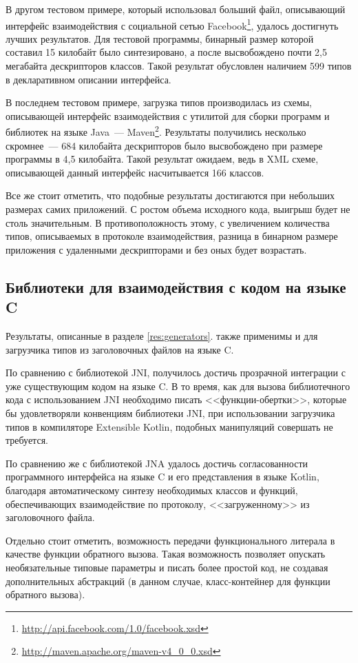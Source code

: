 В другом тестовом примере, который использовал больший файл, описывающий интерфейс взаимодействия с социальной сетью Facebook\footnote{\url{http://api.facebook.com/1.0/facebook.xsd}}, удалось достигнуть лучших результатов.
Для тестовой программы, бинарный размер которой составил 15 килобайт было синтезировано, а после высвобождено почти 2,5 мегабайта дескрипторов классов. Такой результат обусловлен наличием 599 типов в декларативном описании интерфейса.

В последнем тестовом примере, загрузка типов производилась из схемы, описывающей интерфейс взаимодействия с утилитой для сборки программ и библиотек на языке Java~--- Maven\footnote{\url{http://maven.apache.org/maven-v4_0_0.xsd}}.
Результаты получились несколько скромнее~--- 684 килобайта дескрипторов было высвобождено при размере программы в 4,5 килобайта. Такой результат ожидаем, ведь в XML схеме, описывающей данный интерфейс насчитывается 166 классов.

Все же стоит отметить, что подобные результаты достигаются при небольших размерах самих приложений.
С ростом объема исходного кода, выигрыш будет не столь значительным. В противоположность этому, с увеличением количества типов, описываемых в протоколе взаимодействия, разница в бинарном размере приложения с удаленными дескрипторами и без оных будет возрастать.

\subsection{Библиотеки для взаимодействия с кодом на языке C}
Результаты, описанные в разделе \ref{res:generators}. также применимы и для загрузчика типов из заголовочных файлов на языке C.

По сравнению с библиотекой JNI, получилось достичь прозрачной интеграции с уже существующим кодом на языке C.
В то время, как для вызова библиотечного кода с использованием JNI необходимо писать <<функции-обертки>>, которые бы удовлетворяли конвенциям библиотеки JNI, при использовании загрузчика типов в компиляторе Extensible Kotlin, подобных манипуляций совершать не требуется.

По сравнению же с библиотекой JNA удалось достичь согласованности программного интерфейса на языке C и его представления в языке Kotlin,
благодаря автоматическому синтезу необходимых классов и функций, обеспечивающих взаимодействие по протоколу, <<загруженному>> из заголовочного файла.

Отдельно стоит отметить, возможность передачи функционального литерала в качестве функции обратного вызова.
Такая возможность позволяет опускать необязательные типовые параметры и писать более простой код, не создавая дополнительных абстракций (в данном случае, класс-контейнер для функции обратного вызова).
